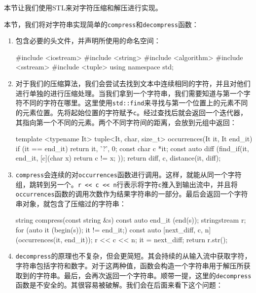 本节让我们使用STL来对字符压缩和解压进行实现。


本节，我们将对字符串实现简单的\texttt{compress}和\texttt{decompress}函数：

\begin{enumerate}
\item 包含必要的头文件，并声明所使用的命名空间：

\begin{codebox}[cpp]
#include <iostream>
#include <string>
#include <algorithm>
#include <sstream>
#include <tuple>
using namespace std;
\end{codebox}

\item 对于我们的压缩算法，我们会尝试去找到文本中连续相同的字符，并且对他们进行单独的进行压缩处理。当我们拿到一个字符串，我们需要知道与第一个字符不同的字符在哪里。这里使用\texttt{std::find}来寻找与第一个位置上的元素不同的元素位置。先将起始位置的字符赋予\texttt{c}。经过查找后就会返回一个迭代器，其指向第一个不同的元素。两个不同字符间的距离，会放到元组中返回：

\begin{codebox}[cpp]
template <typename It>
tuple<It, char, size_t> occurrences(It it, It end_it)
{
    if (it == end_it) { return {it, '?', 0}; }
    const char c {*it};
    const auto diff (find_if(it, end_it,
                    [c](char x) { return c != x; }));
    return {diff, c, distance(it, diff)};
}
\end{codebox}

\item \texttt{compress}会连续的对\texttt{occurrences}函数进行调用。这样，就能从同一个字符组，跳转到另一个。\texttt{r << c << n}行表示将字符\texttt{c}推入到输出流中，并且将\texttt{occurrences}函数的调用次数作为结果字符串的一部分。最后会返回一个字符串对象，就包含了压缩过的字符串：

\begin{codebox}[cpp]
string compress(const string &s)
{
    const auto end_it (end(s));
    stringstream r;
    for (auto it (begin(s)); it != end_it;) {
        const auto [next_diff, c, n] (occurrences(it, end_it));
        r << c << n;
        it = next_diff;
    }
    return r.str();
}
\end{codebox}

\item \texttt{decompress}的原理也不复杂，但会更简短。其会持续的从输入流中获取字符，字符串包括字符和数字。对于这两种值，函数会构造一个字符串用于解压所获取到的字符串。最后，会再次返回一个字符串。顺带一提，这里的\texttt{decompress}函数是不安全的。其很容易被破解。我们会在后面来看下这个问题：


\end{enumerate}
